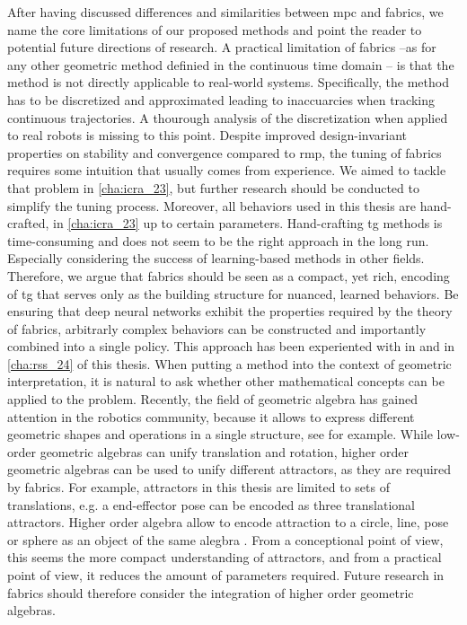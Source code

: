 After having discussed differences and similarities between
\ac{mpc} and \ac{fabrics}, we name the core limitations of
our proposed methods and point the reader to potential
future directions of research. 
A practical limitation of \ac{fabrics} --as for any other
geometric method definied in the continuous time domain --
is that the method is not directly applicable to real-world
systems. Specifically, the method has to be discretized and
approximated leading to inaccuarcies when tracking continuous
trajectories. A thourough analysis of the discretization
when applied to real robots is missing to this point.
Despite improved design-invariant properties on stability
and convergence compared to \ac{rmp}, the tuning of \ac{fabrics} requires some
intuition that usually comes from experience. We aimed to
tackle that problem in \cref{cha:icra_23}, but further
research should be conducted to simplify the tuning process.
Moreover, all behaviors used in this thesis are
hand-crafted, in \cref{cha:icra_23} up to certain
parameters. Hand-crafting \ac{tg} methods is time-consuming
and does not seem to be the right approach in the long run.
Especially considering the success of learning-based methods
in other fields. Therefore, we argue that \ac{fabrics}
should be seen as a compact, yet rich, encoding of
\ac{tg} that serves only as the building structure for
nuanced, learned behaviors. Be ensuring that deep neural
networks exhibit the properties required by the theory of 
\ac{fabrics}, arbitrarly complex behaviors can be
constructed and importantly combined into a single policy.
This approach has been experiented with in \cite{xie2023neural}
and in \cref{cha:rss_24} of this thesis.
When putting a method into the context of geometric
interpretation, it is natural to ask whether other
mathematical concepts can be applied to the problem.
Recently, the field of geometric algebra has gained 
attention in the robotics community, because it allows
to express different geometric shapes and operations in a
single structure, see \cite{low2023geometric} for example.
While low-order geometric algebras can unify translation and
rotation, higher order geometric algebras can be used to unify
different attractors, as they are required by \ac{fabrics}.
For example, attractors in this thesis are limited to
sets of translations, e.g. a end-effector pose can be
encoded as three translational attractors. Higher order
algebra allow to encode attraction to a circle, line, pose
or sphere as an object of the same alegbra \cite{low2023geometric}.
From a conceptional point of view, this seems the more
compact understanding of attractors, and from a practical
point of view, it reduces the amount of parameters required.
Future research in \ac{fabrics} should therefore consider
the integration of higher order geometric algebras.





